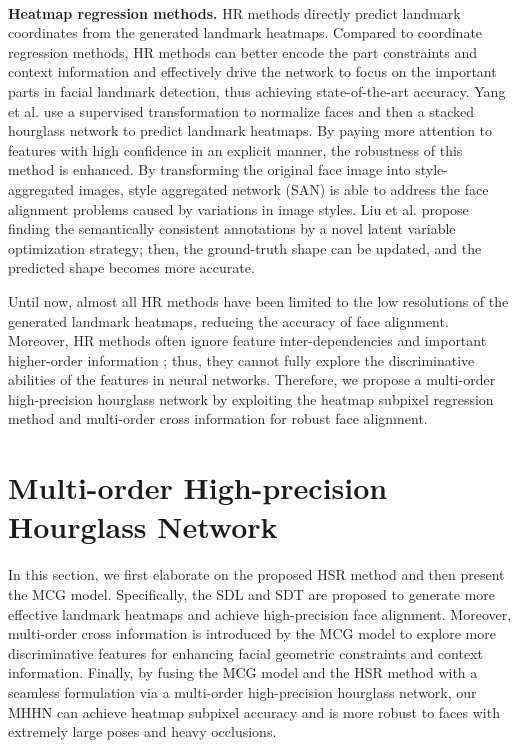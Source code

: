 \documentclass[journal]{IEEEtran}
\begin{document}
\\\indent\textbf{Heatmap regression methods.} HR methods \cite{Yang2017StackedHN, Dong2018StyleAN, Liu2019SemanticAF} directly predict landmark coordinates from the generated landmark heatmaps. Compared to coordinate regression methods, HR methods can better encode the part constraints and context information and effectively drive the network to focus on the important parts in facial landmark detection, thus achieving state-of-the-art accuracy. Yang et al. \cite{Yang2017StackedHN} use a supervised transformation to normalize faces and then a stacked hourglass network to predict landmark heatmaps. By paying more attention to features with high confidence in an explicit manner, the robustness of this method is enhanced. By transforming the original face image into style-aggregated images, style aggregated network (SAN) \cite{Dong2018StyleAN} is able to address the face alignment problems caused by variations in image styles. Liu et al. \cite{Liu2019SemanticAF} propose finding the semantically consistent annotations by a novel latent variable optimization strategy; then, the ground-truth shape can be updated, and the predicted shape becomes more accurate.

Until now, almost all HR methods \cite{Yang2017StackedHN, Dong2018StyleAN, Zhu2019RobustFL} have been limited to the low resolutions of the generated landmark heatmaps, reducing the accuracy of face alignment. Moreover, HR methods often ignore feature inter-dependencies and important higher-order information \cite{Gao2018GlobalSP, Dai2019SecondOrderAN, Wang2019DeepGG, tai2019towards}; thus, they cannot fully explore the discriminative abilities of the features in neural networks. Therefore, we propose a multi-order high-precision hourglass network by exploiting the heatmap subpixel regression method and multi-order cross information for robust face alignment.
\section{Multi-order High-precision Hourglass Network}
In this section, we first elaborate on the proposed HSR method and then present the MCG model. Specifically, the SDL and SDT are proposed to generate more effective landmark heatmaps and achieve high-precision face alignment. Moreover, multi-order cross information is introduced by the MCG model to explore more discriminative features for enhancing facial geometric constraints and context information. Finally, by fusing the MCG model and the HSR method with a seamless formulation via a multi-order high-precision hourglass network, our MHHN can achieve heatmap subpixel accuracy and is more robust to faces with extremely large poses and heavy occlusions.
\end{document}
